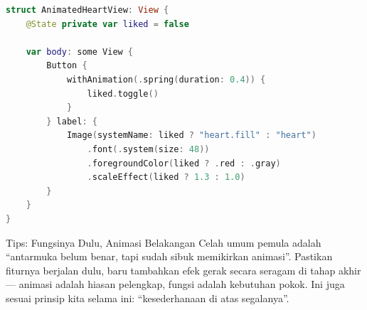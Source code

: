\begin{lstlisting}[language=Swift]
struct AnimatedHeartView: View {
    @State private var liked = false

    var body: some View {
        Button {
            withAnimation(.spring(duration: 0.4)) {
                liked.toggle()
            }
        } label: {
            Image(systemName: liked ? "heart.fill" : "heart")
                .font(.system(size: 48))
                .foregroundColor(liked ? .red : .gray)
                .scaleEffect(liked ? 1.3 : 1.0)
        }
    }
}
\end{lstlisting}

\begin{tcbinfo}{Tips: Fungsinya Dulu, Animasi Belakangan}
Celah umum pemula adalah “antarmuka belum benar, tapi sudah sibuk memikirkan animasi”. Pastikan fiturnya berjalan dulu, baru tambahkan efek gerak secara seragam di tahap akhir — animasi adalah hiasan pelengkap, fungsi adalah kebutuhan pokok. Ini juga sesuai prinsip kita selama ini: “kesederhanaan di atas segalanya”.

\end{tcbinfo}

